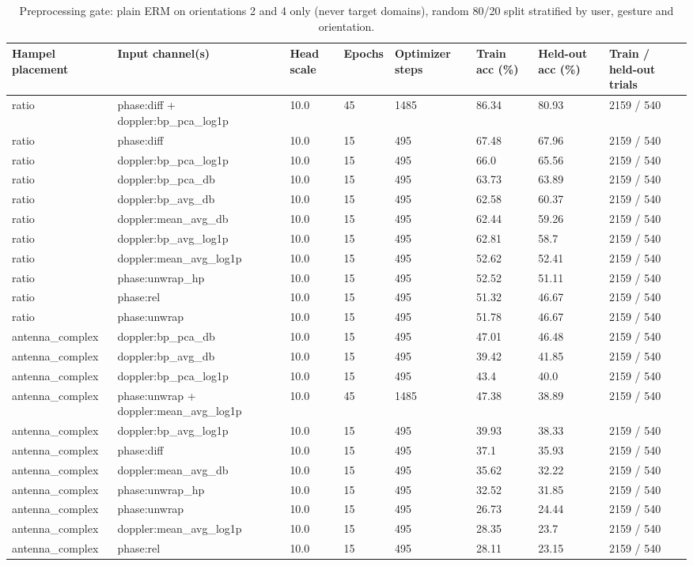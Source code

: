 \begin{table}[t]
\centering
\small
\caption{Preprocessing gate: plain ERM on orientations 2 and 4 only (never target domains), random 80/20 split stratified by user, gesture and orientation.}
\label{tab:T0_preprocessing_gate}
\begin{tabular}{llllllll}
\hline
Hampel placement & Input channel(s) & Head scale & Epochs & Optimizer steps & Train acc (\%) & Held-out acc (\%) & Train / held-out trials \\
\hline
ratio & phase:diff + doppler:bp\_pca\_log1p & 10.0 & 45 & 1485 & 86.34 & 80.93 & 2159 / 540 \\
ratio & phase:diff & 10.0 & 15 & 495 & 67.48 & 67.96 & 2159 / 540 \\
ratio & doppler:bp\_pca\_log1p & 10.0 & 15 & 495 & 66.0 & 65.56 & 2159 / 540 \\
ratio & doppler:bp\_pca\_db & 10.0 & 15 & 495 & 63.73 & 63.89 & 2159 / 540 \\
ratio & doppler:bp\_avg\_db & 10.0 & 15 & 495 & 62.58 & 60.37 & 2159 / 540 \\
ratio & doppler:mean\_avg\_db & 10.0 & 15 & 495 & 62.44 & 59.26 & 2159 / 540 \\
ratio & doppler:bp\_avg\_log1p & 10.0 & 15 & 495 & 62.81 & 58.7 & 2159 / 540 \\
ratio & doppler:mean\_avg\_log1p & 10.0 & 15 & 495 & 52.62 & 52.41 & 2159 / 540 \\
ratio & phase:unwrap\_hp & 10.0 & 15 & 495 & 52.52 & 51.11 & 2159 / 540 \\
ratio & phase:rel & 10.0 & 15 & 495 & 51.32 & 46.67 & 2159 / 540 \\
ratio & phase:unwrap & 10.0 & 15 & 495 & 51.78 & 46.67 & 2159 / 540 \\
antenna\_complex & doppler:bp\_pca\_db & 10.0 & 15 & 495 & 47.01 & 46.48 & 2159 / 540 \\
antenna\_complex & doppler:bp\_avg\_db & 10.0 & 15 & 495 & 39.42 & 41.85 & 2159 / 540 \\
antenna\_complex & doppler:bp\_pca\_log1p & 10.0 & 15 & 495 & 43.4 & 40.0 & 2159 / 540 \\
antenna\_complex & phase:unwrap + doppler:mean\_avg\_log1p & 10.0 & 45 & 1485 & 47.38 & 38.89 & 2159 / 540 \\
antenna\_complex & doppler:bp\_avg\_log1p & 10.0 & 15 & 495 & 39.93 & 38.33 & 2159 / 540 \\
antenna\_complex & phase:diff & 10.0 & 15 & 495 & 37.1 & 35.93 & 2159 / 540 \\
antenna\_complex & doppler:mean\_avg\_db & 10.0 & 15 & 495 & 35.62 & 32.22 & 2159 / 540 \\
antenna\_complex & phase:unwrap\_hp & 10.0 & 15 & 495 & 32.52 & 31.85 & 2159 / 540 \\
antenna\_complex & phase:unwrap & 10.0 & 15 & 495 & 26.73 & 24.44 & 2159 / 540 \\
antenna\_complex & doppler:mean\_avg\_log1p & 10.0 & 15 & 495 & 28.35 & 23.7 & 2159 / 540 \\
antenna\_complex & phase:rel & 10.0 & 15 & 495 & 28.11 & 23.15 & 2159 / 540 \\
\hline
\end{tabular}
\end{table}
